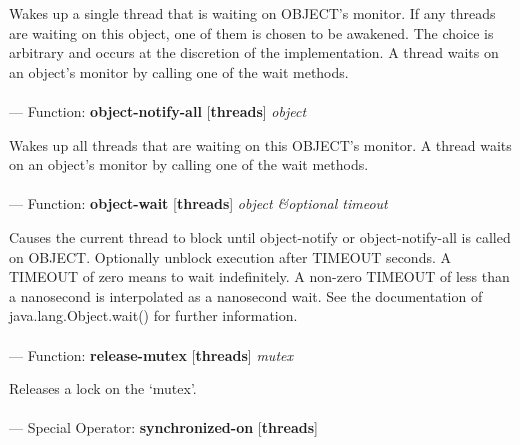 \begin{adjustwidth}{5em}{5em}
Wakes up a single thread that is waiting on OBJECT's monitor.
If any threads are waiting on this object, one of them is chosen to be awakened. The choice is arbitrary and occurs at the discretion of the implementation. A thread waits on an object's monitor by calling one of the wait methods.
\end{adjustwidth}

\paragraph{}
\label{THREADS:OBJECT-NOTIFY-ALL}
--- Function: \textbf{object-notify-all} [\textbf{threads}] \textit{object}

\begin{adjustwidth}{5em}{5em}
Wakes up all threads that are waiting on this OBJECT's monitor.
A thread waits on an object's monitor by calling one of the wait methods.
\end{adjustwidth}

\paragraph{}
\label{THREADS:OBJECT-WAIT}
--- Function: \textbf{object-wait} [\textbf{threads}] \textit{object \&optional timeout}

\begin{adjustwidth}{5em}{5em}
Causes the current thread to block until object-notify or object-notify-all is called on OBJECT.
Optionally unblock execution after TIMEOUT seconds.  A TIMEOUT of zero
means to wait indefinitely.
A non-zero TIMEOUT of less than a nanosecond is interpolated as a nanosecond wait.
See the documentation of java.lang.Object.wait() for further
information.

\end{adjustwidth}

\paragraph{}
\label{THREADS:RELEASE-MUTEX}
--- Function: \textbf{release-mutex} [\textbf{threads}] \textit{mutex}

\begin{adjustwidth}{5em}{5em}
Releases a lock on the `mutex'.
\end{adjustwidth}

\paragraph{}
\label{THREADS:SYNCHRONIZED-ON}
--- Special Operator: \textbf{synchronized-on} [\textbf{threads}] \textit{}

